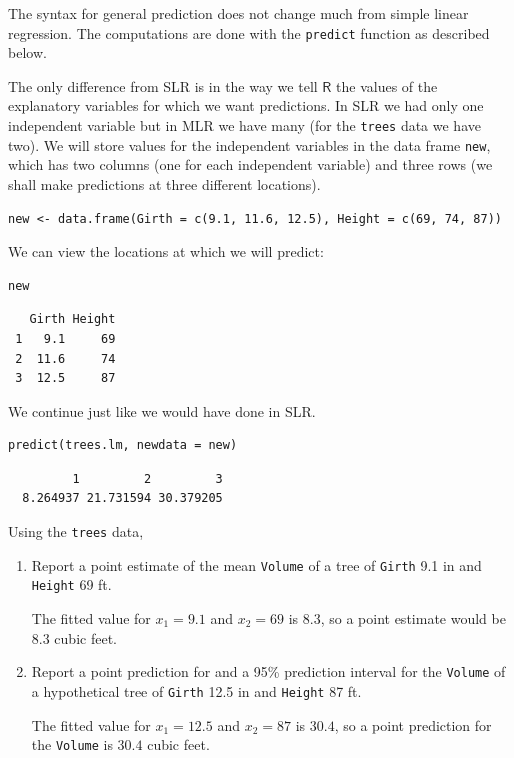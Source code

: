 \documentclass[captions=tableheading]{scrbook}
\begin{document}
The syntax for general prediction does not change much from simple linear regression. The computations are done with the \texttt{predict} function as described below. 

The only difference from SLR is in the way we tell \(\mathsf{R}\) the values of the explanatory variables for which we want predictions. In SLR we had only one independent variable but in MLR we have many (for the \texttt{trees} data we have two). We will store values for the independent variables in the data frame \texttt{new}, which has two columns (one for each independent variable) and three rows (we shall make predictions at three different locations).


\lstset{language=R}
\begin{lstlisting}
new <- data.frame(Girth = c(9.1, 11.6, 12.5), Height = c(69, 74, 87))
\end{lstlisting}

We can view the locations at which we will predict:


\lstset{language=R}
\begin{lstlisting}
new
\end{lstlisting}

\begin{verbatim}
   Girth Height
 1   9.1     69
 2  11.6     74
 3  12.5     87
\end{verbatim}

We continue just like we would have done in SLR.


\lstset{language=R}
\begin{lstlisting}
predict(trees.lm, newdata = new)
\end{lstlisting}

\begin{verbatim}
         1         2         3 
  8.264937 21.731594 30.379205
\end{verbatim}



\begin{example}
Using the \texttt{trees} data,
\begin{enumerate}
\item Report a point estimate of the mean \texttt{Volume} of a tree of \texttt{Girth} 9.1 in and \texttt{Height} 69 ft.

   The fitted value for \(x_{1}=9.1\) and \(x_{2}=69\) is \(  8.3 \), so a point estimate would be \(  8.3 \) cubic feet.
\item Report a point prediction for and a 95\% prediction interval for the \texttt{Volume} of a hypothetical tree of \texttt{Girth} 12.5 in and \texttt{Height} 87 ft.

   The fitted value for \(x_{1} = 12.5\) and \(x_{2} = 87\) is \(  30.4 \), so a point prediction for the \texttt{Volume} is \(  30.4 \) cubic feet.
\end{enumerate}
\end{example}
\end{document}
